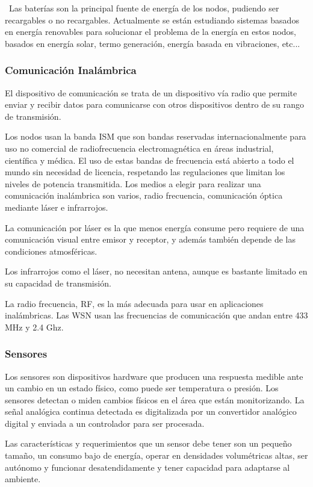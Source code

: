 \ Las bater\'ias son la principal fuente de energ\'ia de los nodos, pudiendo ser recargables o no recargables. Actualmente se est\'an estudiando sistemas basados en energ\'ia renovables para solucionar el problema de la energ\'ia en estos nodos, basados en energ\'ia solar, termo generaci\'on, energ\'ia basada en vibraciones, etc...

\subsubsection{Comunicaci\'on Inal\'ambrica }
El dispositivo de comunicaci\'on se trata de un dispositivo v\'ia radio que permite enviar y recibir datos para comunicarse con otros dispositivos dentro de su rango de transmisi\'on. 

Los nodos usan la banda ISM que son bandas reservadas internacionalmente para uso no comercial de radiofrecuencia electromagn\'etica en \'areas industrial, cient\'ifica y m\'edica. El uso de estas bandas de frecuencia est\'a abierto a todo el mundo sin necesidad de licencia, respetando las regulaciones que limitan los niveles de potencia transmitida. Los medios a elegir para realizar una comunicaci\'on inal\'ambrica son varios, radio frecuencia, comunicaci\'on \'optica mediante l\'aser e infrarrojos. 

La comunicaci\'on por l\'aser es la que menos energ\'ia consume pero requiere de una comunicaci\'on visual entre emisor y receptor, y adem\'as tambi\'en depende de las condiciones atmosf\'ericas. 

Los infrarrojos como el l\'aser, no necesitan antena, aunque es bastante limitado en su capacidad de transmisi\'on. 

La radio frecuencia, RF, es la m\'as adecuada para usar en aplicaciones inal\'ambricas. Las WSN usan las frecuencias de comunicaci\'on que andan entre 433 MHz y 2.4 Ghz.

\subsubsection{Sensores}
Los sensores son dispositivos hardware que producen una respuesta medible ante un cambio en un estado f\'isico, como puede ser temperatura o presi\'on. Los sensores detectan o miden cambios f\'isicos en el \'area que est\'an monitorizando. La se\~nal anal\'ogica continua detectada es digitalizada por un convertidor anal\'ogico digital y enviada a un controlador para ser procesada.

Las caracter\'isticas y requerimientos que un sensor debe tener son un peque\~no tama\~no, un consumo bajo de energ\'ia, operar en densidades volum\'etricas altas, ser aut\'onomo y funcionar desatendidamente y tener capacidad para adaptarse al ambiente. 

